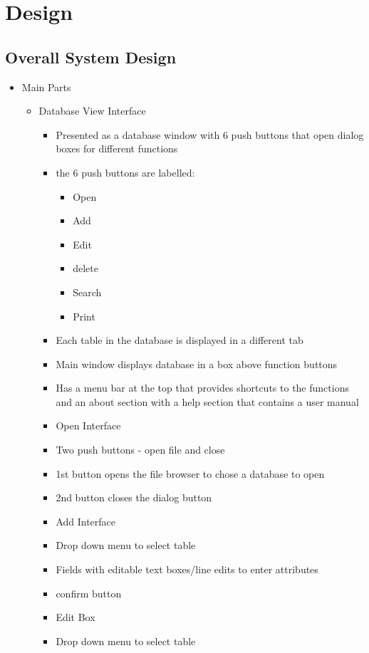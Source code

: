 \chapter{Design}

\section{Overall System Design}

\begin {itemize}
	\item Main Parts
	\begin {itemize}
		\item Database View Interface
		\begin {itemize}
			\item Presented as a database window with 6 push buttons that open dialog boxes for different functions
			\item the 6 push buttons are labelled:
			\begin {itemize}
				\item Open
				\item Add
				\item Edit
				\item delete
				\item Search
				\item Print
			\end {itemize}
		\item Each table in the database is displayed in a different tab
		\item Main window displays database in a box above function buttons
		\item Has a menu bar at the top that provides shortcuts to the functions and an about section with a help section that contains a user manual
	\item Open Interface
		\item Two push buttons - open file and close
		\item 1st button opens the file browser to chose a database to open
		\item 2nd button closes the dialog button
	\item Add Interface
		\item Drop down menu to select table
		\item Fields with editable text boxes/line edits to enter attributes
		\item confirm button
	\item Edit Box
				\item Drop down menu to select table

\end{itemize}
\end{itemize}
\end{itemize}
